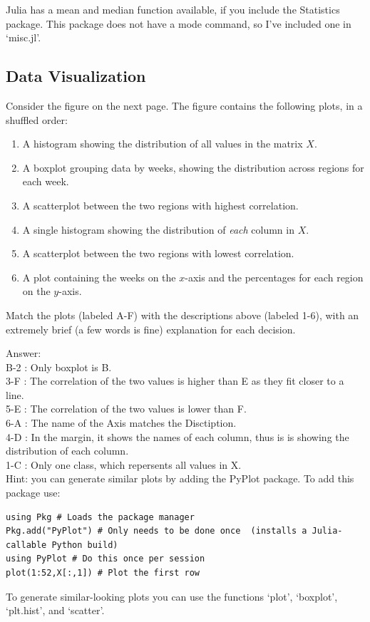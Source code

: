 \documentclass{article}
\def\ans#1{\par\gre{Answer: #1}}
\def\blu#1{{\color{blu}#1}}
\def\gre#1{{\color{gre}#1}}
\def\enum#1{\begin{enumerate}#1\end{enumerate}}
\begin{document}
Julia has a mean and median function available, if you include the Statistics package. This package does not have a mode command, so I've included one in `misc.jl'.


\subsection{Data Visualization}

Consider the figure on the next page.
The figure contains the following plots, in a shuffled order:
\enum{
\item A histogram showing the distribution of all values in the matrix $X$.
\item A boxplot grouping data by weeks, showing the distribution across regions for each week.
\item A scatterplot between the two regions with highest correlation.
\item A single histogram showing the distribution of \emph{each} column in $X$.
\item A scatterplot between the two regions with lowest correlation.
\item A plot containing the weeks on the $x$-axis and the percentages for each region on the $y$-axis.
}
\blu{Match the plots (labeled A-F) with the descriptions above (labeled 1-6), with an extremely brief (a few words is fine) explanation for each decision.}
\ans{\\
    B-2 : Only boxplot is B.\\
    3-F : The correlation of the two values is higher than E as they fit closer to a line.\\
    5-E : The correlation of the two values is lower than F.\\
    6-A : The name of the Axis matches the Disctiption.\\
    4-D : In the margin, it shows the names of each column, thus is is showing the distribution of each column. \\
    1-C : Only one class, which repersents all values in X.\\
}
Hint: you can generate similar plots by adding the PyPlot package. To add this package use:
\begin{verbatim}
using Pkg # Loads the package manager
Pkg.add("PyPlot") # Only needs to be done once  (installs a Julia-callable Python build)
using PyPlot # Do this once per session
plot(1:52,X[:,1]) # Plot the first row
\end{verbatim}
To generate similar-looking plots you can use the functions `plot', `boxplot', `plt.hist', and `scatter'.
\end{document}
